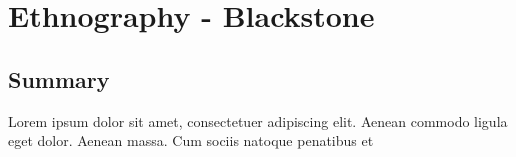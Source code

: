 \chapter{Ethnography - Blackstone}\label{ch15:ethnography}

\section{Summary}\label{ch15:summary}

Lorem ipsum dolor sit amet, consectetuer adipiscing elit. Aenean commodo ligula eget dolor. Aenean massa. Cum sociis natoque penatibus et
